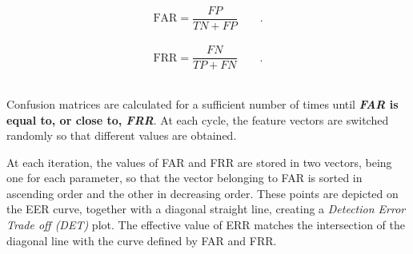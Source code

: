 		\\
		\begin{equation}
			\text{FAR}=\dfrac{FP}{TN+FP} \qquad.
			\label{eq:FAR}
		\end{equation}
		\\
		\begin{equation}
			\text{FRR}=\dfrac{FN}{TP+FN} \qquad.
			\label{eq:FRR}
		\end{equation}
		\\
		\par Confusion matrices are calculated for a sufficient number of times until \textbf{\textit{FAR} is equal to, or close to, \textit{FRR}}. At each cycle, the feature vectors are switched randomly so that different values are obtained. 
		\\
		\par At each iteration, the values of FAR and FRR are stored in two vectors, being one for each parameter, so that the vector belonging to FAR is sorted in ascending order and the other in decreasing order. These points are depicted on the EER curve, together with a diagonal straight line, creating a \textit{Detection Error Trade off (DET)} plot. The effective value of ERR matches the intersection of the diagonal line with the curve defined by FAR and FRR.
